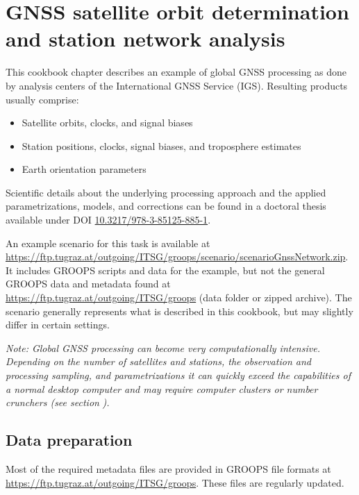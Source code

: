 \section{GNSS satellite orbit determination and station network analysis}\label{cookbook.gnssNetwork}
This cookbook chapter describes an example of global GNSS processing as done by analysis centers of the
International GNSS Service (IGS). Resulting products usually comprise:
\begin{itemize}
  \item Satellite orbits, clocks, and signal biases
  \item Station positions, clocks, signal biases, and troposphere estimates
  \item Earth orientation parameters
\end{itemize}

Scientific details about the underlying processing approach and the applied parametrizations, models, and corrections
can be found in a doctoral thesis available under DOI \href{https://doi.org/10.3217/978-3-85125-885-1}{10.3217/978-3-85125-885-1}.

An example scenario for this task is available at \url{https://ftp.tugraz.at/outgoing/ITSG/groops/scenario/scenarioGnssNetwork.zip}.
It includes GROOPS scripts and data for the example, but not the general GROOPS data and metadata found at \url{https://ftp.tugraz.at/outgoing/ITSG/groops} (data folder or zipped archive).
The scenario generally represents what is described in this cookbook, but may slightly differ in certain settings.

\emph{Note: Global GNSS processing can become very computationally intensive. Depending on the number of satellites
and stations, the observation and processing sampling, and parametrizations it can quickly exceed the capabilities
of a normal desktop computer and may require computer clusters or number crunchers (see section}
\emph{).}

\subsection{Data preparation}\label{cookbook.gnssNetwork:metadata}
Most of the required metadata files are provided in GROOPS file formats at \url{https://ftp.tugraz.at/outgoing/ITSG/groops}.
These files are regularly updated.


